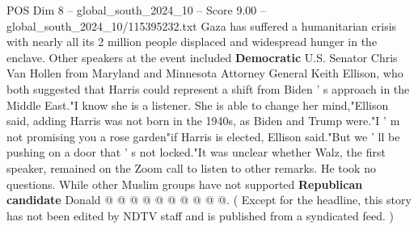 \begin{textsample}{POS Dim 8 – global\_south\_2024\_10 – Score 9.00 – global\_south\_2024\_10/115395232.txt}
Gaza has suffered a humanitarian crisis with nearly all its 2 million people displaced and widespread hunger in the enclave.
Other speakers at the event included \textbf{Democratic} U.S.
Senator Chris Van Hollen from Maryland and Minnesota Attorney General Keith Ellison, who both suggested that Harris could represent a shift from Biden ' s approach in the Middle East."I know she is a listener.
She is able to change her mind,"Ellison said, adding Harris was not born in the 1940s, as Biden and Trump were."I ' m not promising you a rose garden"if Harris is elected, Ellison said."But we ' ll be pushing on a door that ' s not locked."It was unclear whether Walz, the first speaker, remained on the Zoom call to listen to other remarks.
He took no questions.
While other Muslim groups have not supported \textbf{Republican} \textbf{candidate} Donald @ @ @ @ @ @ @ @ @ @. ( Except for the headline, this story has not been edited by NDTV staff and is published from a syndicated feed. )

\end{textsample}
